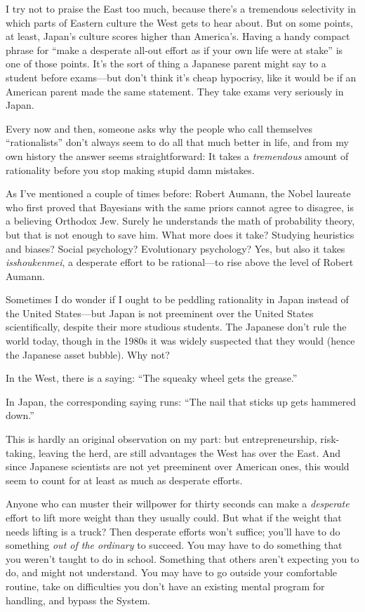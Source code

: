 {
 I try not to praise the East too much, because
there's a tremendous selectivity in which parts of
Eastern culture the West gets to hear about. But on some points, at
least, Japan's culture scores higher than
America's. Having a handy compact phrase for
``make a desperate all-out effort as if your own life
were at stake'' is one of those points.
It's the sort of thing a Japanese parent might say to a
student before exams---but don't think
it's cheap hypocrisy, like it would be if an American
parent made the same statement. They take exams very seriously in
Japan.}

{
 Every now and then, someone asks why the people who call
themselves ``rationalists''
don't always seem to do all that much better in life,
and from my own history the answer seems straightforward: It takes a
\textit{tremendous} amount of rationality before you stop making stupid
damn mistakes.}

{
 As I've mentioned a couple of times before: Robert
Aumann, the Nobel laureate who first proved that Bayesians with the
same priors cannot agree to disagree, is a believing Orthodox Jew.
Surely he understands the math of probability theory, but that is not
enough to save him. What more does it take? Studying heuristics and
biases? Social psychology? Evolutionary psychology? Yes, but also it
takes \textit{isshoukenmei}, a desperate effort to be rational---to
rise above the level of Robert Aumann.}

{
 Sometimes I do wonder if I ought to be peddling rationality in
Japan instead of the United States---but Japan is not preeminent over
the United States scientifically, despite their more studious students.
The Japanese don't rule the world today, though in the
1980s it was widely suspected that they would (hence the Japanese asset
bubble). Why not?}

{
 In the West, there is a saying: ``The squeaky
wheel gets the grease.''}

{
 In Japan, the corresponding saying runs: ``The
nail that sticks up gets hammered down.''}

{
 This is hardly an original observation on my part: but
entrepreneurship, risk-taking, leaving the herd, are still advantages
the West has over the East. And since Japanese scientists are not yet
preeminent over American ones, this would seem to count for at least as
much as desperate efforts.}

{
 Anyone who can muster their willpower for thirty seconds can make
a \textit{desperate} effort to lift more weight than they usually
could. But what if the weight that needs lifting is a truck? Then
desperate efforts won't suffice; you'll
have to do something \textit{out of the ordinary} to succeed. You may
have to do something that you weren't taught to do in
school. Something that others aren't expecting you to
do, and might not understand. You may have to go outside your
comfortable routine, take on difficulties you don't
have an existing mental program for handling, and bypass the System.}

